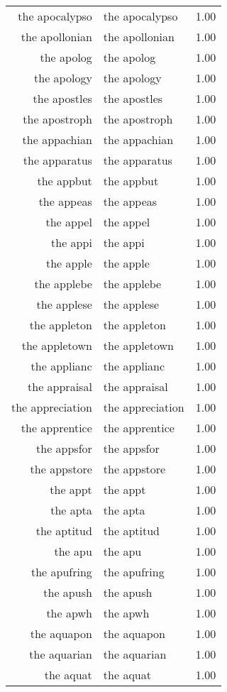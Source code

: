\begin{table}[ht]
\begin{tabular}{rlr}
  the apocalypso & the apocalypso & 1.00 \\ 
  the apollonian & the apollonian & 1.00 \\ 
  the apolog & the apolog & 1.00 \\ 
  the apology & the apology & 1.00 \\ 
  the apostles & the apostles & 1.00 \\ 
  the apostroph & the apostroph & 1.00 \\ 
  the appachian & the appachian & 1.00 \\ 
  the apparatus & the apparatus & 1.00 \\ 
  the appbut & the appbut & 1.00 \\ 
  the appeas & the appeas & 1.00 \\ 
  the appel & the appel & 1.00 \\ 
  the appi & the appi & 1.00 \\ 
  the apple & the apple & 1.00 \\ 
  the applebe & the applebe & 1.00 \\ 
  the applese & the applese & 1.00 \\ 
  the appleton & the appleton & 1.00 \\ 
  the appletown & the appletown & 1.00 \\ 
  the applianc & the applianc & 1.00 \\ 
  the appraisal & the appraisal & 1.00 \\ 
  the appreciation & the appreciation & 1.00 \\ 
  the apprentice & the apprentice & 1.00 \\ 
  the appsfor & the appsfor & 1.00 \\ 
  the appstore & the appstore & 1.00 \\ 
  the appt & the appt & 1.00 \\ 
  the apta & the apta & 1.00 \\ 
  the aptitud & the aptitud & 1.00 \\ 
  the apu & the apu & 1.00 \\ 
  the apufring & the apufring & 1.00 \\ 
  the apush & the apush & 1.00 \\ 
  the apwh & the apwh & 1.00 \\ 
  the aquapon & the aquapon & 1.00 \\ 
  the aquarian & the aquarian & 1.00 \\ 
  the aquat & the aquat & 1.00 \\ 

\end{tabular}
\end{table}
